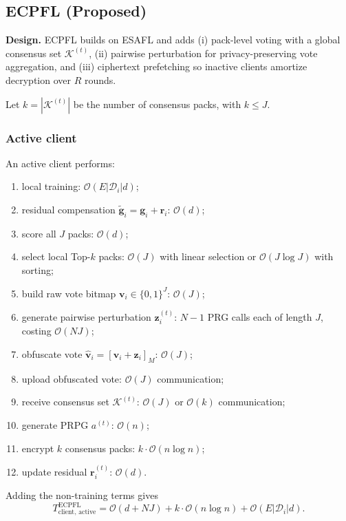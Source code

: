 \documentclass[a4paper,11pt]{article}
\begin{document}
\subsection{ECPFL (Proposed)}
\label{ssec:ecpfl}

\textbf{Design.} ECPFL builds on ESAFL and adds (i) pack-level voting with a global consensus set $\mathcal{K}^{(t)}$, (ii) pairwise perturbation for privacy-preserving vote aggregation, and (iii) ciphertext prefetching so inactive clients amortize decryption over $R$ rounds.

Let $k=|\mathcal{K}^{(t)}|$ be the number of consensus packs, with $k\le J$.

\subsubsection{Active client}
\label{sssec:ecpfl-active}

An active client performs:
\begin{enumerate}
    \item local training: $\mathcal{O}(E|\mathcal{D}_i|d)$;
    \item residual compensation $\tilde{\mathbf{g}}_i=\mathbf{g}_i+\mathbf{r}_i$: $\mathcal{O}(d)$;
    \item score all $J$ packs: $\mathcal{O}(d)$;
    \item select local Top-$k$ packs: $\mathcal{O}(J)$ with linear selection or $\mathcal{O}(J\log J)$ with sorting;
    \item build raw vote bitmap $\mathbf{v}_i\in\{0,1\}^J$: $\mathcal{O}(J)$;
    \item generate pairwise perturbation $\mathbf{z}_i^{(t)}$: $N-1$ PRG calls each of length $J$, costing $\mathcal{O}(NJ)$;
    \item obfuscate vote $\hat{\mathbf{v}}_i=[\mathbf{v}_i+\mathbf{z}_i]_M$: $\mathcal{O}(J)$;
    \item upload obfuscated vote: $\mathcal{O}(J)$ communication;
    \item receive consensus set $\mathcal{K}^{(t)}$: $\mathcal{O}(J)$ or $\mathcal{O}(k)$ communication;
    \item generate PRPG $a^{(t)}$: $\mathcal{O}(n)$;
    \item encrypt $k$ consensus packs: $k\cdot\mathcal{O}(n\log n)$;
    \item update residual $\mathbf{r}_i^{(t)}$: $\mathcal{O}(d)$.
\end{enumerate}
Adding the non-training terms gives
\begin{equation}
\boxed{T_{\text{client, active}}^{\text{ECPFL}} = \mathcal{O}(d+NJ) + k\cdot\mathcal{O}(n\log n) + \mathcal{O}(E|\mathcal{D}_i|d).}
\end{equation}
\end{document}
